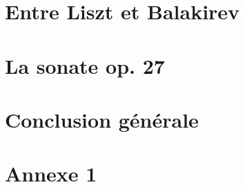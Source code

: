 \documentclass[]{music}
\begin{document}




\newpage
\strut\thispagestyle{empty}
\newpage



\newpage
\strut\thispagestyle{empty}
\newpage

\newpage
\strut\thispagestyle{empty}
\newpage
\tableofcontents
\newpage
\strut\thispagestyle{empty}
\newpage


\part{Entre Liszt et Balakirev}




\part{La sonate op. 27}




\part{Conclusion générale}




\part*{Annexe 1}




\newpage
\strut\thispagestyle{empty}
\newpage





\end{document}
